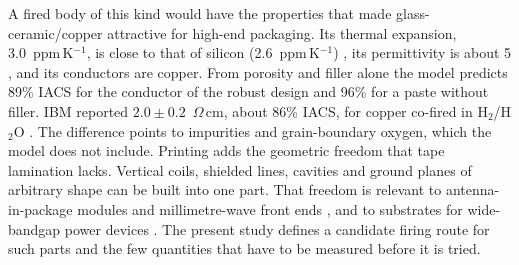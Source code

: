 A fired body of this kind would have the properties that made glass-ceramic/copper attractive for high-end packaging. Its thermal expansion, 3.0~ppm\,K$^{-1}$, is close to that of silicon (2.6~ppm\,K$^{-1}$) \cite{knickerbocker2002advanced}, its permittivity is about 5 \cite{herron1980method}, and its conductors are copper. From porosity and filler alone the model predicts 89\% IACS for the conductor of the robust design and 96\% for a paste without filler. IBM reported $2.0\pm0.2$~\textmu$\Omega$\,cm, about 86\% IACS, for copper co-fired in H$_2$/H$_2$O \cite{herron1980method}. The difference points to impurities and grain-boundary oxygen, which the model does not include. Printing adds the geometric freedom that tape lamination lacks. Vertical coils, shielded lines, cavities and ground planes of arbitrary shape can be built into one part. That freedom is relevant to antenna-in-package modules and millimetre-wave front ends \cite{zhang2019antenna,watanabe2021review}, and to substrates for wide-bandgap power devices \cite{chen2017sic}. The present study defines a candidate firing route for such parts and the few quantities that have to be measured before it is tried.
